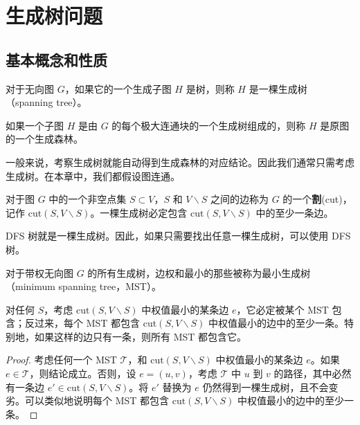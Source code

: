 \chapter{生成树问题}

\section{基本概念和性质}

\begin{definition}[生成树]
    对于无向图 $G$，如果它的一个生成子图 $H$ 是树，则称 $H$ 是一棵生成树（spanning tree）。

    如果一个子图 $H$ 是由 $G$ 的每个极大连通块的一个生成树组成的，则称 $H$ 是原图的一个生成森林。
\end{definition}
\begin{remark}
    一般来说，考察生成树就能自动得到生成森林的对应结论。因此我们通常只需考虑生成树。在本章中，我们都假设图连通。
\end{remark}
\begin{property}[割与生成树]
    对于图 $G$ 中的一个非空点集 $S\subset V$，$S$ 和 $V\backslash S$ 之间的边称为 $G$ 的一个\textbf{割}(cut)，记作 $\mathrm{cut}(S,V\backslash S)$。一棵生成树必定包含 $\mathrm{cut}(S,V\backslash S)$ 中的至少一条边。
\end{property}

DFS 树就是一棵生成树。因此，如果只需要找出任意一棵生成树，可以使用 DFS 树。

\begin{definition}[最小生成树]
    对于带权无向图 $G$ 的所有生成树，边权和最小的那些被称为最小生成树（minimum spanning tree，MST）。
\end{definition}
\begin{theorem}[割性质]
    对任何 $S$，考虑 $\mathrm{cut}(S,V\backslash S)$ 中权值最小的某条边 $e$，它必定被某个 MST 包含；反过来，每个 MST 都包含 $\mathrm{cut}(S,V\backslash S)$ 中权值最小的边中的至少一条。特别地，如果这样的边只有一条，则所有 MST 都包含它。
\end{theorem}
\begin{proof}
    考虑任何一个 MST $\mathcal T$，和 $\mathrm{cut}(S,V\backslash S)$ 中权值最小的某条边 $e$。如果 $e\in\mathcal T$，则结论成立。否则，设 $e=(u,v)$，考虑 $\mathcal T$ 中 $u$ 到 $v$ 的路径，其中必然有一条边 $e'\in \mathrm{cut}(S,V\backslash S)$。将 $e'$ 替换为 $e$ 仍然得到一棵生成树，且不会变劣。可以类似地说明每个 MST 都包含 $\mathrm{cut}(S,V\backslash S)$ 中权值最小的边中的至少一条。
\end{proof}

